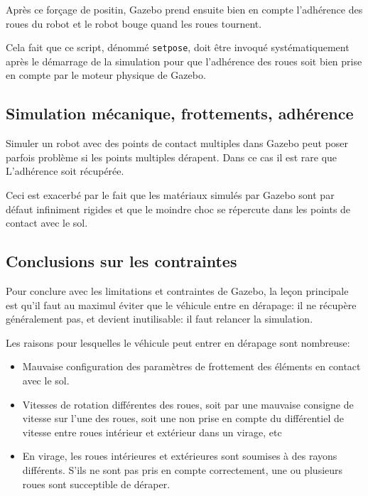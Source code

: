 \documentclass[12pt,a4paper]{report}
\begin{document}
		\para Après ce forçage de positin, Gazebo prend ensuite bien en compte l'adhérence des roues du robot et le robot bouge quand les roues tournent. 
		
		\para Cela fait que ce script, dénommé \verb|setpose|, doit être invoqué systématiquement après le démarrage de la simulation pour que l'adhérence des roues soit bien prise en compte par le moteur physique de Gazebo.
		
		\subsection{Simulation mécanique, frottements, adhérence}
		
		Simuler un robot avec des points de contact multiples dans Gazebo peut poser parfois problème si les points multiples dérapent. Dans ce cas il est rare que L'adhérence soit récupérée.
		
		\para Ceci est exacerbé par le fait que les matériaux simulés par Gazebo sont par défaut infiniment rigides et que le moindre choc se répercute dans les points de contact avec le sol. 

		
		\subsection{Conclusions sur les contraintes}
		\label{conc-contrainte-gazebo}
		Pour conclure avec les limitations et contraintes de Gazebo, la leçon principale est qu'il faut au maximul éviter que le véhicule entre en dérapage: il ne récupère généralement pas, et devient inutilisable: il faut relancer la simulation.
		
		\para Les raisons pour lesquelles le véhicule peut entrer en dérapage sont nombreuse:
		\begin{itemize}
			\item Mauvaise configuration des paramètres de frottement des éléments en contact avec le sol.
			\item  Vitesses de rotation différentes des roues, soit par une mauvaise consigne de vitesse sur l'une des roues, soit une non prise en compte du différentiel de vitesse entre roues intérieur et extérieur dans un virage, etc
			
			\item En virage, les roues intérieures et extérieures sont soumises à des rayons différents. S'ils ne sont pas pris en compte correctement, une ou plusieurs roues sont succeptible de déraper.
		\end{itemize}
\end{document}
